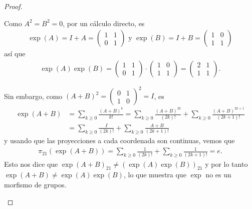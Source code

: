\documentclass[11pt]{article}
\begin{document}
\begin{proof}
\begin{itemize}[listparindent = \parindent]
Como $A^2 = B^2 = 0$, por un c\'alculo directo, es
\begin{align*}
\exp(A) = I + A = \begin{pmatrix}
1 & 1\\
0 & 1
\end{pmatrix} \text{ y } \exp(B) = I + B = \begin{pmatrix}
1 & 0\\
1 & 1
\end{pmatrix}
\end{align*}
as\'i que 
\begin{align*}
\exp(A)\exp(B) = \begin{pmatrix}
1 & 1\\
0 & 1
\end{pmatrix} \cdot \begin{pmatrix}
1 & 0\\
1 & 1
\end{pmatrix} = \begin{pmatrix}
2 & 1\\
1 & 1
\end{pmatrix}.
\end{align*}

Sin embargo, como $(A+B)^2 = \begin{pmatrix}
0 & 1\\
1 & 0
\end{pmatrix}^2 = I$, es
\begin{align*}
\exp(A+B) &= \sum_{k \geq 0}\frac{(A+B)^k}{k!} = \sum_{k \geq 0}\frac{(A+B)^{2k}}{(2k)!} + \sum_{k \geq 0}\frac{(A+B)^{2k+1}}{(2k+1)!}\\
&= \sum_{k \geq 0}\frac{I}{(2k)!} + \sum_{k \geq 0}\frac{A+B}{(2k+1)!}
\end{align*}
y usando que las proyecciones a cada coordenada son continuas, vemos que
\begin{align*}
\pi_{21}(\exp(A+B)) = \sum_{k \geq 0}\frac{1}{(2k)!} + \sum_{k \geq 0}\frac{1}{(2k+1)!} = e.
\end{align*}
Esto nos dice que $\exp(A+B)_{21} \neq (\exp(A)\exp(B))_{21}$ y por lo tanto $\exp(A+B) \neq \exp(A)\exp(B)$, lo que muestra que $\exp$ no es un morfismo de grupos.
\end{itemize}
\end{proof}
\end{document}
